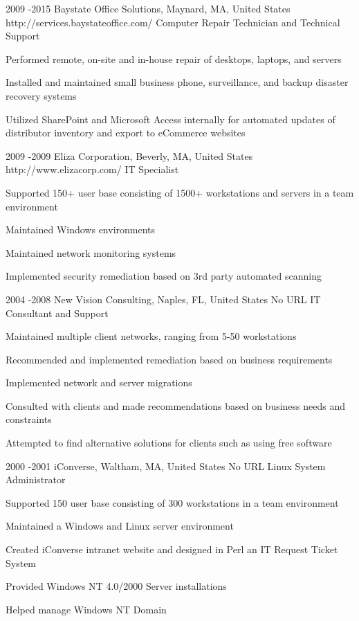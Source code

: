 \documentclass[10pt]{article} %
\begin{document}
\newpage
\job
{2009 -}{2015}
{Baystate Office Solutions, Maynard, MA, United States}
{http://services.baystateoffice.com/}
{Computer Repair Technician and Technical Support}
{\begin{itemize-noindent}
\item{Performed remote, on-site and in-house repair of desktops, laptops, and servers}
\item{Installed and maintained small business phone, surveillance, and backup disaster recovery systems}
\item{Utilized SharePoint and Microsoft Access internally for automated updates of distributor inventory and export to eCommerce websites}
\end{itemize-noindent}}
\job
{2009 -}{2009}
{Eliza Corporation, Beverly, MA, United States}
{http://www.elizacorp.com/}
{IT Specialist}
{\begin{itemize-noindent}
\item{Supported 150+ user base consisting of 1500+ workstations and servers in a team environment}
\item{Maintained Windows environments}
\item{Maintained network monitoring systems}
\item{Implemented security remediation based on 3rd party automated scanning}
\end{itemize-noindent}}
\job
{2004 -}{2008}
{New Vision Consulting, Naples, FL, United States}
{No URL}
{IT Consultant and Support}
{\begin{itemize-noindent}
\item{Maintained multiple client networks, ranging from 5-50 workstations}
\item{Recommended and implemented remediation based on business requirements}
\item{Implemented network and server migrations}
\item{Consulted with clients and made recommendations based on business needs and constraints}
\item{Attempted to find alternative solutions for clients such as using free software}
\end{itemize-noindent}}
\job
{2000 -}{2001}
{iConverse, Waltham, MA, United States}
{No URL}
{Linux System Administrator}
{\begin{itemize-noindent}
\item{Supported 150 user base consisting of 300 workstations in a team environment}
\item{Maintained a Windows and Linux server environment}
\item{Created iConverse intranet website and designed in Perl an IT Request Ticket System}
\item{Provided Windows NT 4.0/2000 Server installations}
\item{Helped manage Windows NT Domain}
\end{itemize-noindent}}
\end{document}
